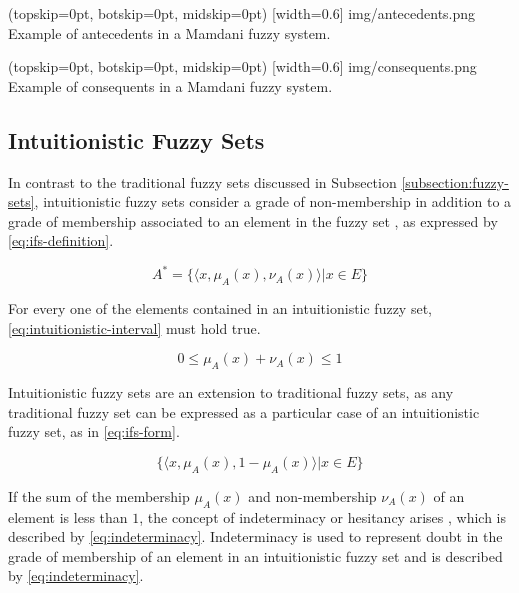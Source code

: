 \documentclass{ieeeaccess}
\begin{document}
\Figure[](topskip=0pt, botskip=0pt, midskip=0pt)
[width=0.6\linewidth]
{img/antecedents.png}
{Example of antecedents in a Mamdani fuzzy system.
  \label{figure:antecedents}}

\Figure[](topskip=0pt, botskip=0pt, midskip=0pt)
[width=0.6\linewidth]
{img/consequents.png}
{Example of consequents in a Mamdani fuzzy system.
  \label{figure:consequents}}

\subsection{Intuitionistic Fuzzy Sets}
\label{subsection:intuitionistic-fuzzy-sets}

In contrast to the traditional fuzzy sets discussed in Subsection
\ref{subsection:fuzzy-sets}, intuitionistic fuzzy sets consider a grade of
non-membership in addition to a grade of membership associated to an element in
the fuzzy set \cite{Atanassov1986}, as expressed by \ref{eq:ifs-definition}.

\begin{equation}
  \label{eq:ifs-definition}
  A^{*} = \{\langle x, \mu _{A} (x), \nu _{A} (x) \rangle | x \in E\}
\end{equation}

For every one of the elements contained in an intuitionistic fuzzy set, 
\ref{eq:intuitionistic-interval} must hold true.

\begin{equation}
  \label{eq:intuitionistic-interval}
  0 \leq \mu_{A}(x) + \nu_{A}(x) \leq 1
\end{equation}

Intuitionistic fuzzy sets are an extension to traditional fuzzy sets, as any
traditional fuzzy set can be expressed as a particular case of an intuitionistic
fuzzy set, as in \ref{eq:ifs-form}.

\begin{equation}
  \label{eq:ifs-form}
  \{ \langle x, \mu_{A}(x), 1 - \mu_{A}(x) \rangle | x \in E \}
\end{equation}

If the sum of the membership $\mu_{A}(x)$ and non-membership $\nu_{A}(x)$ of an
element is less than $1$, the concept of indeterminacy or hesitancy arises \cite{Atanassov1986},
which is described by \ref{eq:indeterminacy}. Indeterminacy is used to represent
doubt in the grade of membership of an element in an intuitionistic fuzzy set
and is described by \ref{eq:indeterminacy}.
\end{document}
